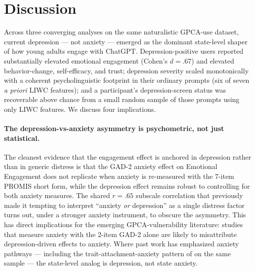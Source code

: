 \documentclass[letterpaper]{article}
\begin{document}
\section{Discussion}

Across three converging analyses on the same naturalistic GPCA-use dataset, current depression --- not anxiety --- emerged as the dominant state-level shaper of how young adults engage with ChatGPT. Depression-positive users reported substantially elevated emotional engagement (Cohen's $d=.67$) and elevated behavior-change, self-efficacy, and trust; depression severity scaled monotonically with a coherent psycholinguistic footprint in their ordinary prompts (six of seven \emph{a priori} LIWC features); and a participant's depression-screen status was recoverable above chance from a small random sample of those prompts using only LIWC features. We discuss four implications.

\paragraph{The depression-vs-anxiety asymmetry is psychometric, not just statistical.} The cleanest evidence that the engagement effect is anchored in depression rather than in generic distress is that the GAD-2 anxiety effect on Emotional Engagement does not replicate when anxiety is re-measured with the 7-item PROMIS short form, while the depression effect remains robust to controlling for both anxiety measures. The shared $r=.65$ subscale correlation that previously made it tempting to interpret ``anxiety \emph{or} depression'' as a single distress factor turns out, under a stronger anxiety instrument, to obscure the asymmetry. This has direct implications for the emerging GPCA-vulnerability literature: studies that measure anxiety with the 2-item GAD-2 alone are likely to misattribute depression-driven effects to anxiety. Where past work has emphasized anxiety pathways --- including the trait-attachment-anxiety pattern of \citet{anon2026attachment} on the same sample --- the state-level analog is depression, not state anxiety.
\end{document}
